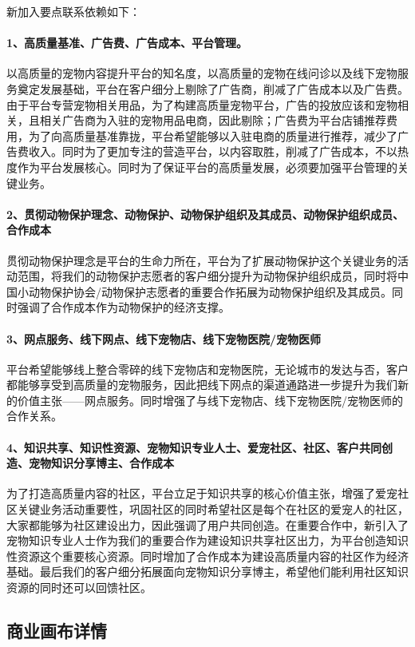 \documentclass[a4paper]{ctexart}
\begin{document}
新加入要点联系依赖如下：

\paragraph{1、高质量基准、广告费、广告成本、平台管理。}以高质量的宠物内容提升平台的知名度，以高质量的宠物在线问诊以及线下宠物服务奠定发展基础，平台在客户细分上剔除了广告商，削减了广告成本以及广告费。由于平台专营宠物相关用品，为了构建高质量宠物平台，广告的投放应该和宠物相关，且相关广告商为入驻的宠物用品电商，因此剔除；广告费为平台店铺推荐费用，为了向高质量基准靠拢，平台希望能够以入驻电商的质量进行推荐，减少了广告费收入。同时为了更加专注的营造平台，以内容取胜，削减了广告成本，不以热度作为平台发展核心。同时为了保证平台的高质量发展，必须要加强平台管理的关键业务。
\paragraph{2、贯彻动物保护理念、动物保护、动物保护组织及其成员、动物保护组织成员、合作成本}贯彻动物保护理念是平台的生命力所在，平台为了扩展动物保护这个关键业务的活动范围，将我们的动物保护志愿者的客户细分提升为动物保护组织成员，同时将中国小动物保护协会/动物保护志愿者的重要合作拓展为动物保护组织及其成员。同时强调了合作成本作为动物保护的经济支撑。
\paragraph{3、网点服务、线下网点、线下宠物店、线下宠物医院/宠物医师}平台希望能够线上整合零碎的线下宠物店和宠物医院，无论城市的发达与否，客户都能够享受到高质量的宠物服务，因此把线下网点的渠道通路进一步提升为我们新的价值主张——网点服务。同时增强了与线下宠物店、线下宠物医院/宠物医师的合作关系。
\paragraph{4、知识共享、知识性资源、宠物知识专业人士、爱宠社区、社区、客户共同创造、宠物知识分享博主、合作成本}为了打造高质量内容的社区，平台立足于知识共享的核心价值主张，增强了爱宠社区关键业务活动重要性，巩固社区的同时希望社区是每个在社区的爱宠人的社区，大家都能够为社区建设出力，因此强调了用户共同创造。在重要合作中，新引入了宠物知识专业人士作为我们的重要合作为建设知识共享社区出力，为平台创造知识性资源这个重要核心资源。同时增加了合作成本为建设高质量内容的社区作为经济基础。最后我们的客户细分拓展面向宠物知识分享博主，希望他们能利用社区知识资源的同时还可以回馈社区。

\subsection{商业画布详情}
\end{document}
